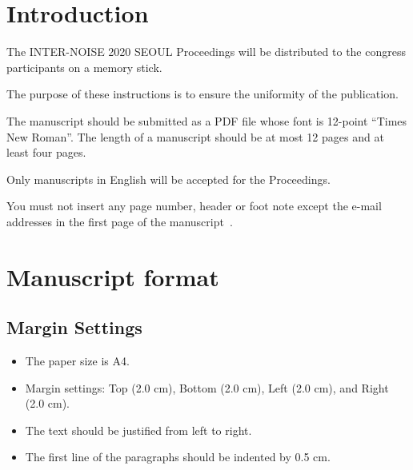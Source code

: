 \section{Introduction}

The INTER-NOISE 2020 SEOUL Proceedings will be distributed to the congress participants on a memory stick.\par
The purpose of these instructions is to ensure the uniformity of the publication.\par
The manuscript should be submitted as a PDF file whose font is 12-point ``Times New Roman''. The length of a manuscript should be at most 12 pages and at least four pages.\par
Only manuscripts in English will be accepted for the Proceedings.\par
You must not insert any page number, header or foot note except the e-mail addresses in the first page of the manuscript~\cite{herranz19}.

\clearpage
\section{Manuscript format}

\subsection{Margin Settings}

\begin{itemize}
	\item The paper size is A4.
	\item Margin settings: Top (2.0 cm), Bottom (2.0 cm), Left (2.0 cm), and Right (2.0 cm).
	\item The text should be justified from left to right.
	\item The first line of the paragraphs should be indented by 0.5 cm. 
\end{itemize}

